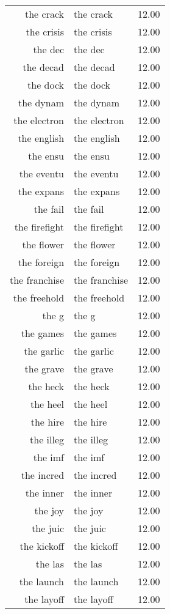 \begin{table}[ht]
\begin{tabular}{rlr}
  the crack & the crack & 12.00 \\ 
  the crisis & the crisis & 12.00 \\ 
  the dec & the dec & 12.00 \\ 
  the decad & the decad & 12.00 \\ 
  the dock & the dock & 12.00 \\ 
  the dynam & the dynam & 12.00 \\ 
  the electron & the electron & 12.00 \\ 
  the english & the english & 12.00 \\ 
  the ensu & the ensu & 12.00 \\ 
  the eventu & the eventu & 12.00 \\ 
  the expans & the expans & 12.00 \\ 
  the fail & the fail & 12.00 \\ 
  the firefight & the firefight & 12.00 \\ 
  the flower & the flower & 12.00 \\ 
  the foreign & the foreign & 12.00 \\ 
  the franchise & the franchise & 12.00 \\ 
  the freehold & the freehold & 12.00 \\ 
  the g & the g & 12.00 \\ 
  the games & the games & 12.00 \\ 
  the garlic & the garlic & 12.00 \\ 
  the grave & the grave & 12.00 \\ 
  the heck & the heck & 12.00 \\ 
  the heel & the heel & 12.00 \\ 
  the hire & the hire & 12.00 \\ 
  the illeg & the illeg & 12.00 \\ 
  the imf & the imf & 12.00 \\ 
  the incred & the incred & 12.00 \\ 
  the inner & the inner & 12.00 \\ 
  the joy & the joy & 12.00 \\ 
  the juic & the juic & 12.00 \\ 
  the kickoff & the kickoff & 12.00 \\ 
  the las & the las & 12.00 \\ 
  the launch & the launch & 12.00 \\ 
  the layoff & the layoff & 12.00 \\ 

\end{tabular}
\end{table}
